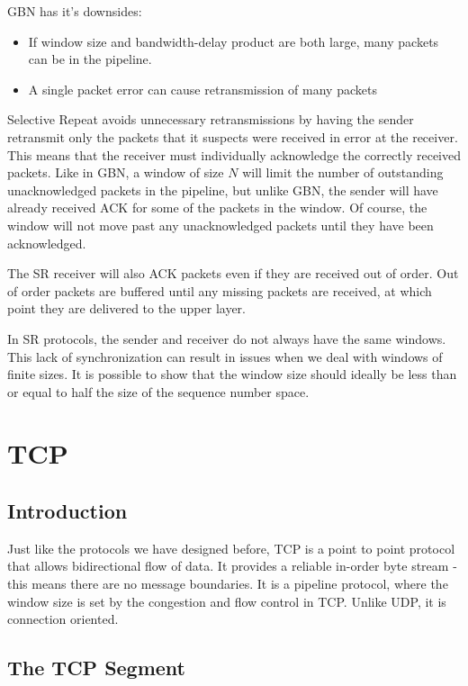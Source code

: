 \documentclass[12pt,letterpaper]{amsbook}
\theoremstyle{definition}
\begin{document}
GBN has it's downsides:

\begin{itemize}
  \item If window size and bandwidth-delay product are both large, many packets can be in the pipeline.
  \item A single packet error can cause retransmission of many packets
\end{itemize}

Selective Repeat avoids unnecessary retransmissions by having the sender retransmit only the packets that it suspects were received in error at the receiver. This means that the receiver must individually acknowledge the correctly received packets. Like in GBN, a window of size $N$ will limit the number of outstanding unacknowledged packets in the pipeline, but unlike GBN, the sender will have already received ACK for some of the packets in the window. Of course, the window will not move past any unacknowledged packets until they have been acknowledged.

The SR receiver will also ACK packets even if they are received out of order. Out of order packets are buffered until any missing packets are received, at which point they are delivered to the upper layer.

In SR protocols, the sender and receiver do not always have the same windows. This lack of synchronization can result in issues when we deal with windows of finite sizes. It is possible to show that the window size should ideally be less than or equal to half the size of the sequence number space.

\section{TCP}

\subsection{Introduction}

Just like the protocols we have designed before, TCP is a point to point protocol that allows bidirectional flow of data. It provides a reliable in-order byte stream - this means there are no message boundaries. It is a pipeline protocol, where the window size is set by the congestion and flow control in TCP. Unlike UDP, it is connection oriented.

\subsection{The TCP Segment}
\end{document}
